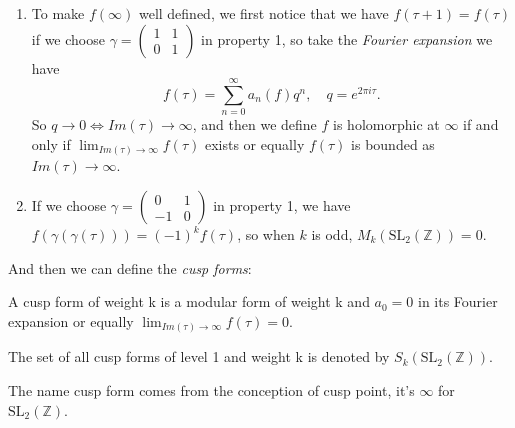     \begin{remark}
        \begin{enumerate}
            \item To make $f(\infty)$ well defined, we first notice that we have $f(\tau+1)=f(\tau)$ if we choose 
            $\gamma= \left(
                \begin{smallmatrix}
                1 & 1 \\
                0 & 1
                \end{smallmatrix}
            \right)$ 
            in property 1, so take the \textit{Fourier expansion} we have $$f(\tau)=\sum_{n = 0}^{\infty} a_n(f)q^n ,\quad q=e^{2\pi i\tau}.$$ So $q\rightarrow0\Leftrightarrow Im(\tau )\rightarrow\infty$, and then we define $f$ is holomorphic at $\infty$ if and only if $\lim_{Im(\tau) \to \infty}f(\tau)$ exists or equally $f(\tau)$ is bounded as $Im(\tau) \to \infty$.  
            \item If we choose $\gamma= \left(
                \begin{smallmatrix}
                0 & 1 \\
                -1 & 0
                \end{smallmatrix}
            \right)$ 
            in property 1, we have $f(\gamma(\gamma(\tau)))=(-1)^kf(\tau)$, so when $k$ is odd, $M_k(\mathrm{SL}_2(\mathbb{Z}))={0}$.
        \end{enumerate}
    \end{remark}

    And then we can define the \textit{cusp forms}:

    \begin{definition}
        A cusp form of weight k is a modular form of weight k and $a_0=0$ in its Fourier expansion or equally $\lim_{Im(\tau) \to \infty}f(\tau)=0$.

        The set of all cusp forms of level 1 and weight k is denoted by $S_k(\mathrm{SL}_2(\mathbb{Z}))$.
    \end{definition}

    The name cusp form comes from the conception of cusp point, it's $\infty$ for $\mathrm{SL}_2(\mathbb{Z})$.  

